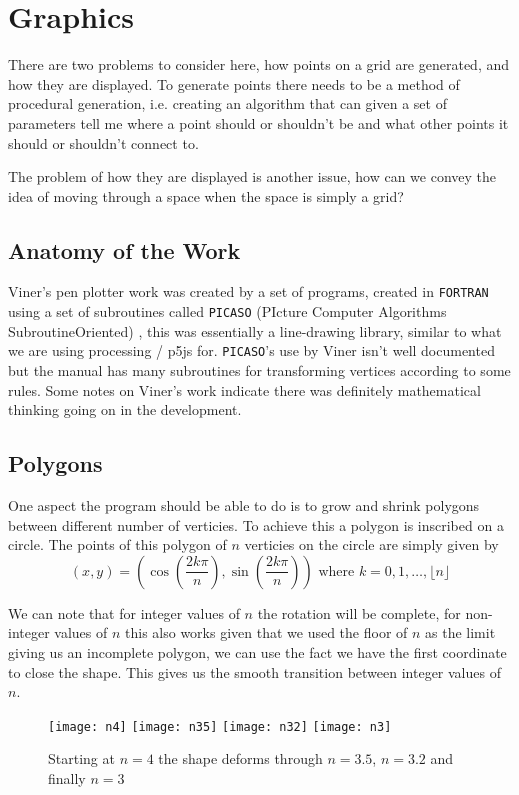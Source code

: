 \chapter{Graphics}

There are two problems to consider here, how points on a grid are generated, and
how they are displayed. To generate points there needs to be a method of
procedural generation, i.e. creating an algorithm that can given a set of
parameters tell me where a point should or shouldn't be and what other points it
should or shouldn't connect to.

The problem of how they are displayed is another issue, how can we convey the
idea of moving through a space when the space is simply a grid? 

\section{Anatomy of the Work}
Viner's pen plotter work was created by a set of programs, created in
\verb|FORTRAN| using a set of subroutines called \verb|PICASO| (PIcture Computer
Algorithms SubroutineOriented) \citep{lycett_2016}, this was essentially a
line-drawing library, similar to what we are using processing / p5js for.
\verb|PICASO|'s use by Viner isn't well documented but the manual
\citep{picaso_manual} has many subroutines for transforming vertices according
to some rules. Some notes on Viner's work indicate there was definitely
mathematical thinking going on in the development.

\section{Polygons}
One aspect the program should be able to do is to grow and shrink polygons
between different number of verticies. To achieve this a polygon is inscribed on
a circle. The points of this polygon of $n$ verticies on the circle are simply given by
$$(x, y) = (\cos(\frac{2k \pi}{n}), \sin(\frac{2k\pi}{n})) \text{ where } k = 0,
1, \ldots, \lfloor n \rfloor$$ 

We can note that for integer values of $n$ the rotation will be complete, for
non-integer values of $n$ this also works given that we used the floor of $n$ as
the limit giving us an incomplete polygon, we can use the fact we have the first
coordinate to close the shape. This gives us the smooth transition between
integer values of $n$.

\begin{figure}[H]
    \centering
    \texttt{[image: n4]}
    \texttt{[image: n35]}
    \texttt{[image: n32]}
    \texttt{[image: n3]}
    \caption{Starting at $n=4$ the shape deforms through $n=3.5$, $n=3.2$ and
    finally $n=3$}
\end{figure}

